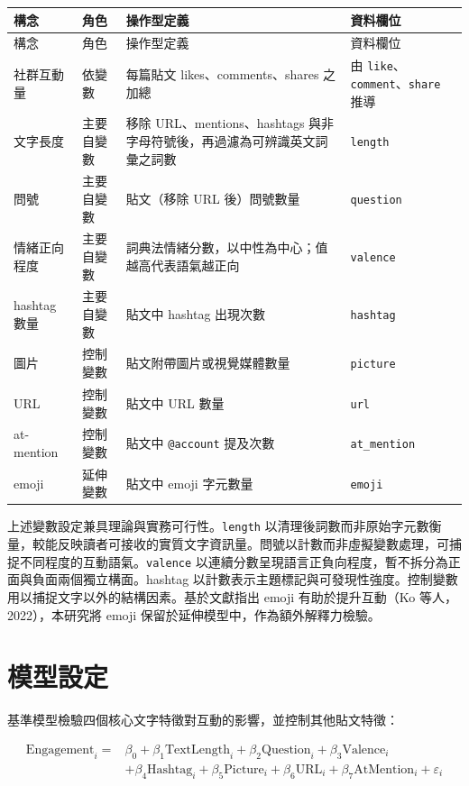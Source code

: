 \documentclass[12pt,a4paper]{ctexart}
\begin{document}
\begin{longtable}{p{} p{} p{} p{}}
\toprule
構念 & 角色 & 操作型定義 & 資料欄位 \\
\midrule
\endfirsthead
\toprule
構念 & 角色 & 操作型定義 & 資料欄位 \\
\midrule
\endhead
社群互動量 & 依變數 & 每篇貼文 likes、comments、shares 之加總 & 由 \texttt{like}、\texttt{comment}、\texttt{share} 推導 \\
文字長度 & 主要自變數 & 移除 URL、mentions、hashtags 與非字母符號後，再過濾為可辨識英文詞彙之詞數 & \texttt{length} \\
問號 & 主要自變數 & 貼文（移除 URL 後）問號數量 & \texttt{question} \\
情緒正向程度 & 主要自變數 & 詞典法情緒分數，以中性為中心；值越高代表語氣越正向 & \texttt{valence} \\
hashtag 數量 & 主要自變數 & 貼文中 hashtag 出現次數 & \texttt{hashtag} \\
圖片 & 控制變數 & 貼文附帶圖片或視覺媒體數量 & \texttt{picture} \\
URL & 控制變數 & 貼文中 URL 數量 & \texttt{url} \\
at-mention & 控制變數 & 貼文中 \texttt{@account} 提及次數 & \texttt{at\_mention} \\
emoji & 延伸變數 & 貼文中 emoji 字元數量 & \texttt{emoji} \\
\bottomrule
\end{longtable}

上述變數設定兼具理論與實務可行性。\texttt{length} 以清理後詞數而非原始字元數衡量，較能反映讀者可接收的實質文字資訊量。問號以計數而非虛擬變數處理，可捕捉不同程度的互動語氣。\texttt{valence} 以連續分數呈現語言正負向程度，暫不拆分為正面與負面兩個獨立構面。hashtag 以計數表示主題標記與可發現性強度。控制變數用以捕捉文字以外的結構因素。基於文獻指出 emoji 有助於提升互動（Ko 等人，2022），本研究將 emoji 保留於延伸模型中，作為額外解釋力檢驗。

\section{模型設定}
基準模型檢驗四個核心文字特徵對互動的影響，並控制其他貼文特徵：

\begin{equation}
\begin{aligned}
\text{Engagement}_i = {}& \beta_0 + \beta_1\text{TextLength}_i + \beta_2\text{Question}_i + \beta_3\text{Valence}_i \\
& + \beta_4\text{Hashtag}_i + \beta_5\text{Picture}_i + \beta_6\text{URL}_i + \beta_7\text{AtMention}_i + \varepsilon_i
\end{aligned}
\end{equation}
\end{document}

